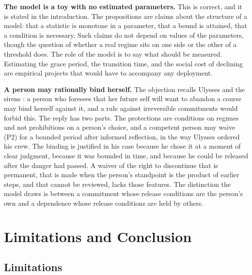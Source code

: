 \documentclass[11pt]{article}
\theoremstyle{plain}
\theoremstyle{definition}
\theoremstyle{remark}
\begin{document}
\textbf{The model is a toy with no estimated parameters.} This is correct, and it is stated in the introduction. The propositions are claims about the structure of a model: that a statistic is monotone in a parameter, that a bound is attained, that a condition is necessary. Such claims do not depend on values of the parameters, though the question of whether a real regime sits on one side or the other of a threshold does. The role of the model is to say what should be measured. Estimating the grace period, the transition time, and the social cost of declining are empirical projects that would have to accompany any deployment.

\textbf{A person may rationally bind herself.} The objection recalls Ulysses and the sirens \cite{elster1979}: a person who foresees that her future self will want to abandon a course may bind herself against it, and a rule against irreversible commitments would forbid this. The reply has two parts. The protections are conditions on regimes and not prohibitions on a person's choice, and a competent person may waive (P2) for a bounded period after informed reflection, in the way Ulysses ordered his crew. The binding is justified in his case because he chose it at a moment of clear judgment, because it was bounded in time, and because he could be released after the danger had passed. A waiver of the right to discontinue that is permanent, that is made when the person's standpoint is the product of earlier steps, and that cannot be reviewed, lacks those features. The distinction the model draws is between a commitment whose release conditions are the person's own and a dependence whose release conditions are held by others.

\section{Limitations and Conclusion}\label{sec:limits}

\subsection{Limitations}
\end{document}
